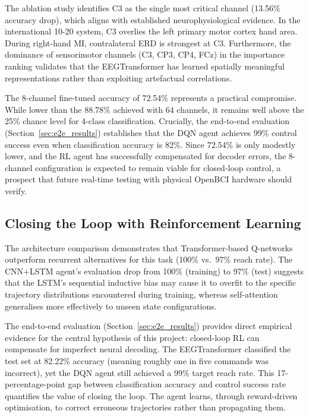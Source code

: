 \documentclass[12pt, a4paper]{article}
\begin{document}
The ablation study identifies C3 as the single most critical channel (13.56\% accuracy drop), which aligns with established neurophysiological evidence. In the international 10-20 system, C3 overlies the left primary motor cortex hand area. During right-hand MI, contralateral ERD is strongest at C3. Furthermore, the dominance of sensorimotor channels (C3, CP3, CP4, FCz) in the importance ranking validates that the EEGTransformer has learned spatially meaningful representations rather than exploiting artefactual correlations.

The 8-channel fine-tuned accuracy of 72.54\% represents a practical compromise. While lower than the 88.78\% achieved with 64 channels, it remains well above the 25\% chance level for 4-class classification. Crucially, the end-to-end evaluation (Section~\ref{sec:e2e_results}) establishes that the DQN agent achieves 99\% control success even when classification accuracy is 82\%. Since 72.54\% is only modestly lower, and the RL agent has successfully compensated for decoder errors, the 8-channel configuration is expected to remain viable for closed-loop control, a prospect that future real-time testing with physical OpenBCI hardware should verify.

\subsection{Closing the Loop with Reinforcement Learning}

The architecture comparison demonstrates that Transformer-based Q-networks outperform recurrent alternatives for this task (100\% vs.~97\% reach rate). The CNN+LSTM agent's evaluation drop from 100\% (training) to 97\% (test) suggests that the LSTM's sequential inductive bias may cause it to overfit to the specific trajectory distributions encountered during training, whereas self-attention generalises more effectively to unseen state configurations.

The end-to-end evaluation (Section~\ref{sec:e2e_results}) provides direct empirical evidence for the central hypothesis of this project: closed-loop RL can compensate for imperfect neural decoding. The EEGTransformer classified the test set at 82.22\% accuracy (meaning roughly one in five commands was incorrect), yet the DQN agent still achieved a 99\% target reach rate. This 17-percentage-point gap between classification accuracy and control success rate quantifies the value of closing the loop. The agent learns, through reward-driven optimisation, to correct erroneous trajectories rather than propagating them.
\end{document}
